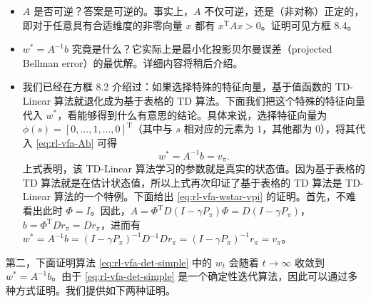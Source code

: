 \begin{itemize}
  \item $A$ 是否可逆？答案是可逆的。事实上，$A$ 不仅可逆，还是（非对称）正定的，即对于任意具有合适维度的非零向量 $x$ 都有 $x^{\mathrm{T}}Ax > 0$。证明可见方框 8.4。
  \item $w^{*} = A^{-1}b$ 究竟是什么？它实际上是最小化投影贝尔曼误差（projected Bellman error）的最优解。详细内容将稍后介绍。
  \item 我们已经在方框 8.2 介绍过：如果选择特殊的特征向量，基于值函数的 TD-Linear 算法就退化成为基于表格的 TD 算法。下面我们把这个特殊的特征向量代入 $w^{*}$，看能够得到什么有意思的结论。具体来说，选择特征向量为 $\phi(s)=[0,\ldots,1,\ldots,0]^{\mathrm{T}}$（其中与 $s$ 相对应的元素为 $1$，其他都为 $0$），将其代入 \cref{eq:rl-vfa-Ab} 可得
  \begin{equation}
  w^{*} = A^{-1} b = v_{\pi}.
  \label{eq:rl-vfa-wstar-vpi}
  \end{equation}
  上式表明，该 TD-Linear 算法学习的参数就是真实的状态值。因为基于表格的 TD 算法就是在估计状态值，所以上式再次印证了基于表格的 TD 算法是 TD-Linear 算法的一个特例。下面给出 \cref{eq:rl-vfa-wstar-vpi} 的证明。首先，不难看出此时 $\Phi = I$。因此，$A = \Phi^{\mathrm{T}}D(I - \gamma P_{\pi})\Phi = D(I - \gamma P_{\pi})$，$b = \Phi^{\mathrm{T}}Dr_{\pi} = Dr_{\pi}$，进而有 $w^{*} = A^{-1}b = (I - \gamma P_{\pi})^{-1}D^{-1}Dr_{\pi} = (I - \gamma P_{\pi})^{-1}r_{\pi} = v_{\pi}$。
\end{itemize}

第二，下面证明算法 \cref{eq:rl-vfa-det-simple} 中的 $w_{t}$ 会随着 $t\to\infty$ 收敛到 $w^{*}=A^{-1}b$。由于 \cref{eq:rl-vfa-det-simple} 是一个确定性迭代算法，因此可以通过多种方式证明。我们提供如下两种证明。

